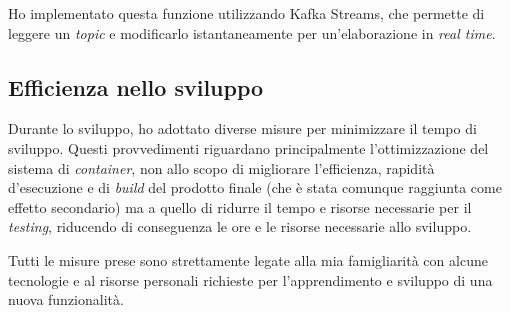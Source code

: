 Ho implementato questa funzione utilizzando Kafka Streams, che permette di leggere un \textit{topic} e modificarlo istantaneamente per un'elaborazione in \textit{real time}.

\subsection{Efficienza nello sviluppo}

Durante lo sviluppo, ho adottato diverse misure per minimizzare il tempo di sviluppo.
Questi provvedimenti riguardano principalmente l'ottimizzazione del sistema di \textit{container}, non allo scopo di migliorare l'efficienza, rapidità d'esecuzione e di \textit{build} del prodotto finale (che è stata comunque raggiunta come effetto secondario) ma a quello di ridurre il tempo e risorse necessarie per il \textit{testing}, riducendo di conseguenza le ore e le risorse necessarie allo sviluppo.

Tutti le misure prese sono strettamente legate alla mia famigliarità con alcune tecnologie e al risorse personali richieste per l'apprendimento e sviluppo di una nuova funzionalità.

